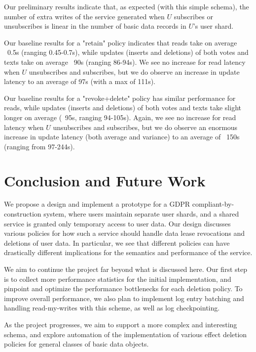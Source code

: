 \documentclass[letterpaper,twocolumn,10pt]{article}
\begin{document}
Our preliminary results indicate that, as expected (with this simple schema), the number of extra writes of the service generated when $U$ subscribes or unsubscribes is linear in the number of basic data records in $U$'s user shard.

Our baseline results for a "retain" policy indicates that reads take on average ~0.5s (ranging 0.45-0.7s), while updates (inserts and deletions) of both votes and texts take on average ~90s (ranging 86-94s).
We see no increase for read latency when $U$ unsubscribes and subscribes, but we do observe an increase in update latency to an average of 97s (with a max of 111s).

Our baseline results for a "revoke+delete" policy has similar performance for reads, while updates (inserts and deletions) of both votes and texts take slight longer on average (~95s, ranging 94-105s).
Again, we see no increase for read latency when $U$ unsubscribes and subscribes, but we do observe an enormous increase in update latency (both average and variance) to an average of ~150s (ranging from 97-244s).

\section{Conclusion and Future Work}
We propose a design and implement a prototype for a GDPR compliant-by-construction system, where users maintain separate user shards, and a shared service is granted only temporary access to user data. Our design discusses various policies for how such a service should handle data lease revocations and deletions of user data. In particular, we see that different policies can have drastically different implications for the semantics and performance of the service.

We aim to continue the project far beyond what is discussed here. Our first step is to collect more performance statistics for the initial implementation, and pinpoint and optimize the performance bottlenecks for each deletion policy. 
To improve overall performance, we also plan to implement log entry batching and handling read-my-writes with this scheme, as well as log checkpointing.

As the project progresses, we aim to support a more complex and interesting schema, and explore automation of the implementation of various effect deletion policies for general classes of basic data objects.
\end{document}
